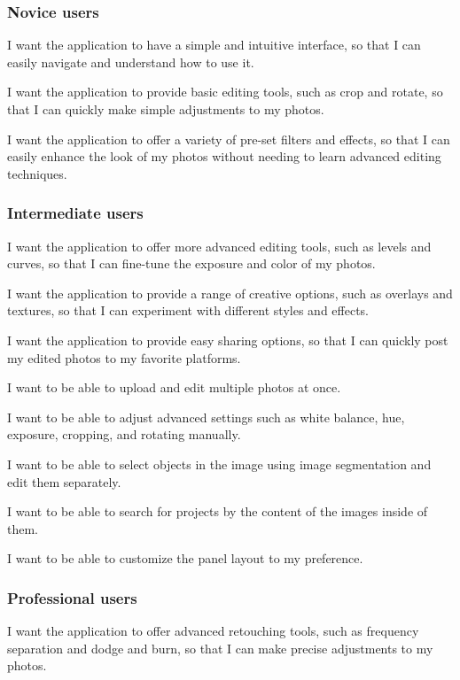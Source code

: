 \documentclass[11pt,a4paper]{article}
\begin{document}
\subsubsection*{Novice users}

I want the application to have a simple and intuitive interface, so that I can
easily navigate and understand how to use it.

I want the application to provide basic editing tools, such as crop and rotate,
so that I can quickly make simple adjustments to my photos.

I want the application to offer a variety of pre-set filters and effects, so
that I can easily enhance the look of my photos without needing to learn
advanced editing techniques.

\subsubsection*{Intermediate users}

I want the application to offer more advanced editing tools, such as levels and
curves, so that I can fine-tune the exposure and color of my photos.

I want the application to provide a range of creative options, such as overlays
and textures, so that I can experiment with different styles and effects.

I want the application to provide easy sharing options, so that I can quickly
post my edited photos to my favorite platforms.

I want to be able to upload and edit multiple photos at once.

I want to be able to adjust advanced settings such as white balance, hue,
exposure, cropping, and rotating manually.

I want to be able to select objects in the image using image segmentation and
edit them separately.

I want to be able to search for projects by the content of the images inside of
them.

I want to be able to customize the panel layout to my preference.


\subsubsection*{Professional users}

I want the application to offer advanced retouching tools, such as frequency
separation and dodge and burn, so that I can make precise adjustments to my
photos.
\end{document}
